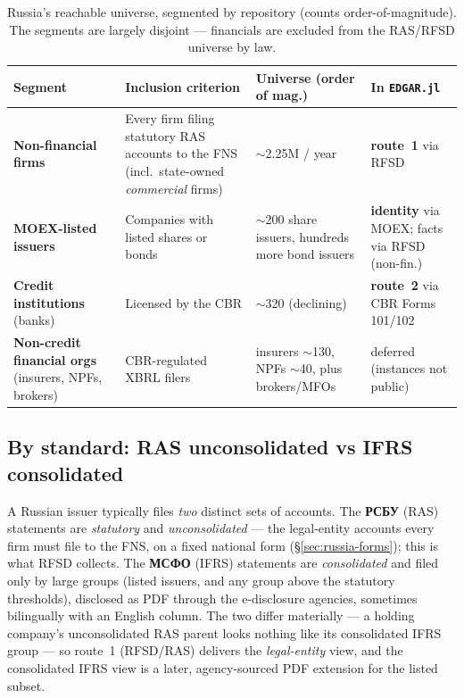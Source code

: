 \documentclass[11pt,a4paper]{report}
\newcommand{\rus}[1]{{\rusfont #1}}
\begin{document}
\begin{table}[h]
\centering
\small
\caption{Russia's reachable universe, segmented by repository (counts order-of-magnitude). The segments are
largely disjoint --- financials are excluded from the RAS/RFSD universe by law.}
\label{tab:russia-entities}
\begin{tabular}{@{}p{}p{}p{}p{}@{}}
\toprule
\textbf{Segment} & \textbf{Inclusion criterion} & \textbf{Universe (order of mag.)} & \textbf{In
\texttt{EDGAR.jl}} \\
\midrule
\textbf{Non-financial firms} & Every firm filing statutory RAS accounts to the FNS (incl.\ state-owned
  \emph{commercial} firms) & $\sim$2.25M / year & \textbf{route~1} via RFSD \\
\textbf{MOEX-listed issuers} & Companies with listed shares or bonds & $\sim$200 share issuers, hundreds more
  bond issuers & \textbf{identity} via MOEX; facts via RFSD (non-fin.) \\
\textbf{Credit institutions} (banks) & Licensed by the CBR & $\sim$320 (declining) & \textbf{route~2} via CBR
  Forms 101/102 \\
\textbf{Non-credit financial orgs} (insurers, NPFs, brokers) & CBR-regulated XBRL filers & insurers
  $\sim$130, NPFs $\sim$40, plus brokers/MFOs & deferred (instances not public) \\
\bottomrule
\end{tabular}
\end{table}

\subsection{By standard: RAS unconsolidated vs IFRS consolidated}
A Russian issuer typically files \emph{two} distinct sets of accounts. The \textbf{\rus{РСБУ}} (RAS) statements
are \emph{statutory} and \emph{unconsolidated} --- the legal-entity accounts every firm must file to the FNS,
on a fixed national form (\S\ref{sec:russia-forms}); this is what RFSD collects. The \textbf{\rus{МСФО}} (IFRS)
statements are \emph{consolidated} and filed only by large groups (listed issuers, and any group above the
statutory thresholds), disclosed as PDF through the e-disclosure agencies, sometimes bilingually with an
English column. The two differ materially --- a holding company's unconsolidated RAS parent looks nothing like
its consolidated IFRS group --- so route~1 (RFSD/RAS) delivers the \emph{legal-entity} view, and the
consolidated IFRS view is a later, agency-sourced PDF extension for the listed subset.
\end{document}
